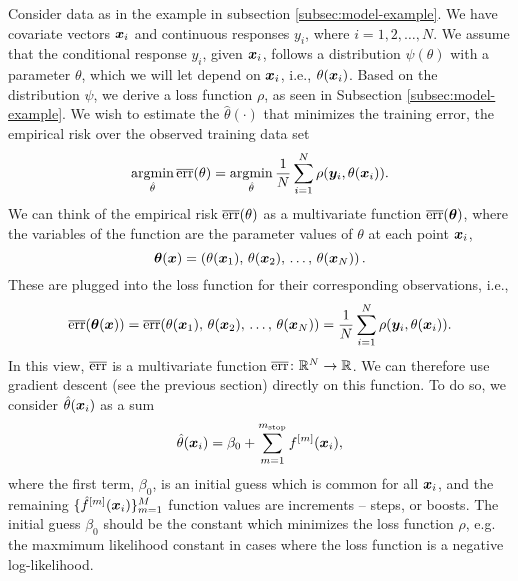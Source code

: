 Consider data as in the example in subsection \ref{subsec:model-example}.
We have covariate vectors $\bm{x}_i$ and continuous responses $y_i$, where $i=1,2,\ldots,N$.
We assume that the conditional response $y_i$, given $\bm{x}_i$, follows a distribution $\psi(\theta)$ with a parameter $\theta$, which we will let depend on $\bm{x}_i$, i.e., $\theta(\bm{x}_i)$.
Based on the distribution $\psi$, we derive a loss function $\rho$, as seen in Subsection \ref{subsec:model-example}.
We wish to estimate the $\hat{\theta}(\cdot)$ that minimizes the training error, the empirical risk over the observed training data set
\begin{equation*}
    \operatorname*{argmin}_{\hat{\theta}}\overline{\text{err}}(\theta)=\operatorname*{argmin}_{\hat{\theta}}\frac{1}{N}\sum_{i=1}^{N} \rho(\bm{y}_i,\theta(\bm{x}_i)).
\end{equation*}
We can think of the empirical risk $\overline{\text{err}}(\theta)$ as a multivariate function $\overline{\text{err}}(\boldsymbol{\theta})$, where the variables of the function are the parameter values of $\theta$ at each point $\bm{x}_i$,
\begin{equation*}
    \boldsymbol{\theta}(\bm{x})=\left(\theta(\bm{x}_1),\,\theta(\bm{x}_2),\,\ldots,\,\theta(\bm{x}_N)\right).
\end{equation*}
These are plugged into the loss function for their corresponding observations, i.e.,
\begin{equation*}
    \overline{\text{err}}(\boldsymbol{\theta}(\bm{x}))=\overline{\text{err}}(\theta(\bm{x}_1),\,\theta(\bm{x}_2),\,\ldots,\,\theta(\bm{x}_N))=\frac{1}{N}\sum_{i=1}^{N} \rho(\bm{y}_i,\theta(\bm{x}_i)).
\end{equation*}
In this view, $\overline{\text{err}}$ is a multivariate function $\overline{\text{err}}\colon\mathbb{R}^N\to\mathbb{R}$.
We can therefore use gradient descent (see the previous section) directly on this function.
To do so, we consider $\hat{\theta}(\bm{x}_i)$ as a sum
\begin{equation*}
    \hat{\theta}(\bm{x}_i)=\beta_0+\sum_{m=1}^{m_{\text{stop}}}f^{[m]}(\bm{x}_i),
\end{equation*}
where the first term, $\beta_0$, is an initial guess which is common for all $\bm{x}_i$, and the remaining $\{\hat{f}^{[m]}(\bm{x}_i)\}_{m=1}^M$ function values are increments -- steps, or boosts.
The initial guess $\beta_0$ should be the constant which minimizes the loss function $\rho$, e.g. the maxmimum likelihood constant in cases where the loss function is a negative log-likelihood.

